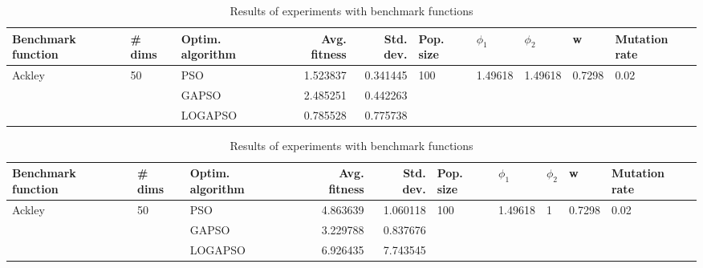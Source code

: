 \documentclass{article}
\begin{document}
\begin{table}
\centering
\caption{Results of experiments with benchmark functions}
\begin{tabular}{lllrrlllll}
\toprule
     Benchmark function &             \# dims & Optim. algorithm &  Avg. fitness &  Std. dev. &            Pop. size &               $\phi_{1}$ &               $\phi_{2}$ &                       w &         Mutation rate \\
\midrule
\multirow{3}{*}{Ackley} & \multirow{3}{*}{50} &              PSO &      1.523837 &   0.341445 & \multirow{3}{*}{100} & \multirow{3}{*}{1.49618} & \multirow{3}{*}{1.49618} & \multirow{3}{*}{0.7298} & \multirow{3}{*}{0.02} \\
                        &                     &            GAPSO &      2.485251 &   0.442263 &                      &                          &                          &                         &                       \\
                        &                     &          LOGAPSO &      0.785528 &   0.775738 &                      &                          &                          &                         &                       \\
\bottomrule
\end{tabular}
\end{table}
\begin{table}
\centering
\caption{Results of experiments with benchmark functions}
\begin{tabular}{lllrrlllll}
\toprule
     Benchmark function &             \# dims & Optim. algorithm &  Avg. fitness &  Std. dev. &            Pop. size &               $\phi_{1}$ &         $\phi_{2}$ &                       w &         Mutation rate \\
\midrule
\multirow{3}{*}{Ackley} & \multirow{3}{*}{50} &              PSO &      4.863639 &   1.060118 & \multirow{3}{*}{100} & \multirow{3}{*}{1.49618} & \multirow{3}{*}{1} & \multirow{3}{*}{0.7298} & \multirow{3}{*}{0.02} \\
                        &                     &            GAPSO &      3.229788 &   0.837676 &                      &                          &                    &                         &                       \\
                        &                     &          LOGAPSO &      6.926435 &   7.743545 &                      &                          &                    &                         &                       \\
\bottomrule
\end{tabular}
\end{table}
\end{document}
